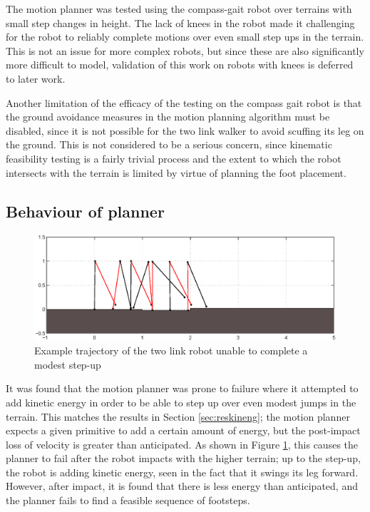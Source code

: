 The motion planner was tested using the compass-gait robot over terrains with small step changes in height. The lack of knees in the robot made it challenging for the robot to reliably complete motions over even small step ups in the terrain. This is not an issue for more complex robots, but since these are also significantly more difficult to model, validation of this work on robots with knees is deferred to later work.

Another limitation of the efficacy of the testing on the compass gait robot is that the ground avoidance measures in the motion planning algorithm must be disabled, since it is not possible for the two link walker to avoid scuffing its leg on the ground. This is not considered to be a serious concern, since kinematic feasibility testing is a fairly trivial process and the extent to which the robot intersects with the terrain is limited by virtue of planning the foot placement.

\subsection{Behaviour of planner}
\begin{figure}
\centering
\includegraphics[width=\linewidth]{7Results/stepupfault}
\caption{Example trajectory of the two link robot unable to complete a modest step-up}
\label{fig:stepupfault}
\end{figure}

It was found that the motion planner was prone to failure where it attempted to add kinetic energy in order to be able to step up over even modest jumps in the terrain. This matches the results in Section \ref{sec:reskineng}; the motion planner expects a given primitive to add a certain amount of energy, but the post-impact loss of velocity is greater than anticipated. As shown in Figure \ref{fig:stepupfault}, this causes the planner to fail after the robot impacts with the higher terrain; up to the step-up, the robot is adding kinetic energy, seen in the fact that it swings its leg forward. However, after impact, it is found that there is less energy than anticipated, and the planner fails to find a feasible sequence of footsteps.

